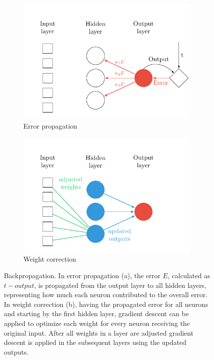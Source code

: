 \begin{figure}[htb]
  \begin{subfigure}[b]{0.5\textwidth}
    \includegraphics[width=\textwidth]{tkz/mlp-backpropagation-1}
    \captionsetup{justification=centering}
    \caption{Error propagation}
    \label{fig:sec:theory:mlp:backprop-1}
  \end{subfigure}
  \hfill
  \begin{subfigure}[b]{0.5\textwidth}
    \includegraphics[width=\textwidth]{tkz/mlp-backpropagation-2}
    \captionsetup{justification=centering}
    \caption{Weight correction}
    \label{fig:sec:theory:mlp:backprop-2}
  \end{subfigure}
  \caption{Backpropagation.
    In error propagation (a), the error $E$, calculated as $t - output$, is propagated from the output layer to all hidden layers, representing how much each neuron contributed to the overall error.
    In weight correction (b), having the propagated error for all neurons and starting by the first hidden layer, gradient descent can be applied to optimize each weight for every neuron receiving the original input.
    After all weights in a layer are adjusted gradient descent is applied in the subsequent layers using the updated outputs.}
  \label{fig:sec:theory:mlp:backprop}
\end{figure}

